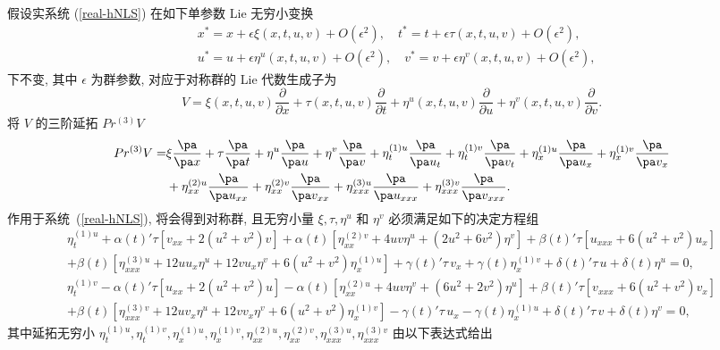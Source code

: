 假设实系统 (\ref{real-hNLS}) 在如下单参数 Lie 无穷小变换
\begin{equation}\label{Lie-T}
\begin{aligned}
&x^*=x+\epsilon \xi(x,t,u,v)+O(\epsilon^2),\quad t^*= t+\epsilon \tau(x,t,u,v)+O(\epsilon^2),\\
&u^*= u+\epsilon \eta^u(x,t,u,v)+O(\epsilon^2),\quad v^*= v+\epsilon \eta^v(x,t,u,v)+O(\epsilon^2),
\end{aligned}
\end{equation}
下不变, 其中 $\epsilon$ 为群参数, 对应于对称群的 Lie 代数生成子为
\begin{equation}\label{Vector-rNLS}
V=\xi(x,t,u,v)\frac{\partial}{\partial x}+\tau(x,t,u,v)\frac{\partial}{\partial t}+\eta^u(x,t,u,v)\frac{\partial}{\partial u}+\eta^v(x,t,u,v)\frac{\partial}{\partial v}.
\end{equation}
将 $V$ 的三阶延拓 $Pr^{(3)}V$ 
\begin{align*}
Pr^{(3)}V=&\xi\frac{\pa }{\pa x}+\tau\frac{\pa }{\pa t}+\eta^u\frac{\pa }{\pa u}+\eta^v\frac{\pa }{\pa v}+\eta_t^{(1)u}\frac{\pa}{\pa u_t}+\eta_t^{(1)v}\frac{\pa}{\pa v_t}+\eta_x^{(1)u}\frac{\pa}{\pa u_x}+\eta_x^{(1)v}\frac{\pa}{\pa v_x}\\
&+\eta_{xx}^{(2)u}\frac{\pa}{\pa u_{xx}}+\eta_{xx}^{(2)v}\frac{\pa}{\pa v_{xx}}+\eta_{xxx}^{(3)u}\frac{\pa}{\pa u_{xxx}}+\eta_{xxx}^{(3)v}\frac{\pa}{\pa v_{xxx}}.
\end{align*}
作用于系统~(\ref{real-hNLS}), 将会得到对称群, 且无穷小量 $\xi, \tau, \eta^u$ 和 $\eta^v$ 必须满足如下的决定方程组
\begin{equation}\label{Determin-equs}
\begin{aligned}
\eta^{(1)u}_t +\alpha(t)'\tau[v_{xx}+2(u^2+v^2)v]+\alpha(t)[\eta^{(2)v}_{xx}+4uv\eta^{u}+(2u^2+6v^2)\eta^v] +\beta(t)'\tau[u_{xxx}+6(u^2+v^2)u_x]\\
+\beta(t)[\eta^{(3)u}_{xxx}+12uu_x\eta^u+12vu_x\eta^v+6(u^2+v^2)\eta^{(1)u}_x] +\gamma(t)'\tau\,v_x+\gamma(t)\eta^{(1)v}_{x}+\delta(t)'\tau\,u+\delta(t)\eta^u=0,\\
\eta^{(1)v}_t
-\alpha(t)'\tau[u_{xx}+2(u^2+v^2)u]-\alpha(t)[\eta^{(2)u}_{xx}+4uv\eta^{v}+(6u^2+2v^2)\eta^u] +\beta(t)'\tau[v_{xxx}+6(u^2+v^2)v_x]\\
+\beta(t)[\eta^{(3)v}_{xxx}+12uv_x\eta^u+12vv_x\eta^v+6(u^2+v^2)\eta^{(1)v}_x] -\gamma(t)'\tau\,u_x-\gamma(t)\eta^{(1)u}_{x}+\delta(t)'\tau\,v+\delta(t)\eta^v=0,
\end{aligned}
\end{equation}
其中延拓无穷小 $\eta^{(1)u}_t, \eta^{(1)v}_t, \eta^{(1)u}_x, \eta^{(1)v}_x, \eta^{(2)u}_{xx}, \eta^{(2)v}_{xx}, \eta^{(3)u}_{xxx}, \eta^{(3)v}_{xxx}$ 由以下表达式给出
